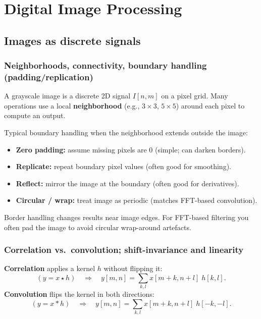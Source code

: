 \documentclass[11pt,a4paper]{article}
\begin{document}
\section{Digital Image Processing}

\subsection{Images as discrete signals}

\subsubsection{Neighborhoods, connectivity, boundary handling (padding/replication)}

\begin{defbox}
A grayscale image is a discrete 2D signal $I[n,m]$ on a pixel grid. Many operations use a local
\textbf{neighborhood} (e.g., $3\times 3$, $5\times 5$) around each pixel to compute an output.
\end{defbox}

Typical boundary handling when the neighborhood extends outside the image:
\begin{itemize}
  \item \textbf{Zero padding:} assume missing pixels are 0 (simple; can darken borders).
  \item \textbf{Replicate:} repeat boundary pixel values (often good for smoothing).
  \item \textbf{Reflect:} mirror the image at the boundary (often good for derivatives).
  \item \textbf{Circular / wrap:} treat image as periodic (matches FFT-based convolution).
\end{itemize}

\begin{notebox}
Border handling changes results near image edges. For FFT-based filtering you often pad the image
to avoid circular wrap-around artefacts.
\end{notebox}


\subsubsection{Correlation vs.\ convolution; shift-invariance and linearity}

\begin{defbox}
\textbf{Correlation} applies a kernel $h$ without flipping it:
\[
(y = x \star h)\quad\Rightarrow\quad
y[m,n] = \sum_{k,l} x[m+k,n+l]\;h[k,l].
\]
\textbf{Convolution} flips the kernel in both directions:
\[
(y = x * h)\quad\Rightarrow\quad
y[m,n] = \sum_{k,l} x[m+k,n+l]\;h[-k,-l].
\]
\end{defbox}
\end{document}
